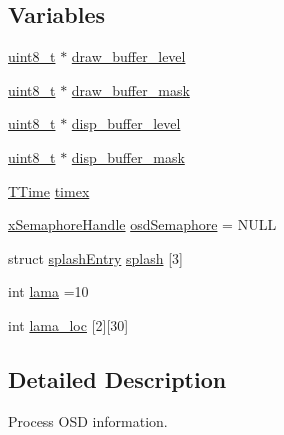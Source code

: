 \subsection*{Variables}
\begin{DoxyCompactItemize}
\item 
\hyperlink{stdint_8h_aba7bc1797add20fe3efdf37ced1182c5}{uint8\-\_\-t} $\ast$ \hyperlink{group___o_s_d_g_e_n_module_ga52b5c0fc86a398ddf62c5b2bb383374d}{draw\-\_\-buffer\-\_\-level}
\item 
\hyperlink{stdint_8h_aba7bc1797add20fe3efdf37ced1182c5}{uint8\-\_\-t} $\ast$ \hyperlink{group___o_s_d_g_e_n_module_ga67085db0125b910109083e4d2605d7d5}{draw\-\_\-buffer\-\_\-mask}
\item 
\hyperlink{stdint_8h_aba7bc1797add20fe3efdf37ced1182c5}{uint8\-\_\-t} $\ast$ \hyperlink{group___o_s_d_g_e_n_module_gac6ace302511130c48032b40f32a40bb8}{disp\-\_\-buffer\-\_\-level}
\item 
\hyperlink{stdint_8h_aba7bc1797add20fe3efdf37ced1182c5}{uint8\-\_\-t} $\ast$ \hyperlink{group___o_s_d_g_e_n_module_ga2de64a6d3102b302a9b7582d63f09485}{disp\-\_\-buffer\-\_\-mask}
\item 
\hyperlink{struct_t_time}{T\-Time} \hyperlink{group___o_s_d_g_e_n_module_gac6e460448d29f05aad59dc67c3035057}{timex}
\item 
\hyperlink{_common_2_libraries_2_free_r_t_o_s_2_source_2include_2semphr_8h_aa91aa1b6835a184838f9ccf138a6ad10}{x\-Semaphore\-Handle} \hyperlink{group___o_s_d_g_e_n_module_ga34f96a89a1ad6c4649787dbc18e218e5}{osd\-Semaphore} = N\-U\-L\-L
\item 
struct \hyperlink{structsplash_entry}{splash\-Entry} \hyperlink{group___o_s_d_g_e_n_module_gafd73dea95bd8cae01a8225936c4c302e}{splash} \mbox{[}3\mbox{]}
\item 
int \hyperlink{group___o_s_d_g_e_n_module_ga36bea199c0657c29a6c7836f8157066e}{lama} =10
\item 
int \hyperlink{group___o_s_d_g_e_n_module_ga35258f3e002e3b7d6dc3a50b458c1ed5}{lama\-\_\-loc} \mbox{[}2\mbox{]}\mbox{[}30\mbox{]}
\end{DoxyCompactItemize}


\subsection{Detailed Description}
Process O\-S\-D information. 

